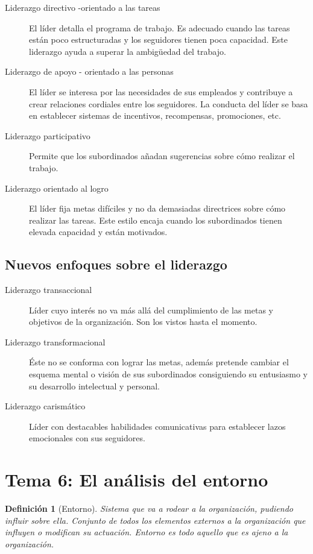 \documentclass[12pt]{article}
\theoremstyle{definition_wo_parentheses}
\newtheorem{definicion}{Definición}[section]
\begin{document}
\begin{description}
\item[Liderazgo directivo -orientado a las tareas] El líder detalla el programa de trabajo. Es adecuado cuando las tareas están poco estructuradas y los seguidores tienen poca capacidad. Este liderazgo ayuda a superar la ambigüedad del trabajo.
\item[Liderazgo de apoyo - orientado a las personas] El líder se interesa por las necesidades de sus empleados y contribuye a crear relaciones cordiales entre los seguidores. La conducta del líder se basa en establecer sistemas de incentivos, recompensas, promociones, etc.
\item[Liderazgo participativo] Permite que los subordinados añadan sugerencias sobre cómo realizar el trabajo.
\item[Liderazgo orientado al logro] El líder fija metas difíciles y no da demasiadas directrices sobre cómo realizar las tareas. Este estilo encaja cuando los subordinados tienen elevada capacidad y están motivados.
\end{description}

\subsection{Nuevos enfoques sobre el liderazgo}

\begin{description}
\item[Liderazgo transaccional] Líder cuyo interés no va más allá del cumplimiento de las metas y objetivos de la organización. Son los vistos hasta el momento. 
\item[Liderazgo transformacional] Éste no se conforma con lograr las metas, además pretende cambiar el esquema mental o visión de sus subordinados consiguiendo su entusiasmo y su desarrollo intelectual y personal.
\item[Liderazgo carismático] Líder con destacables habilidades comunicativas para establecer lazos emocionales con sus seguidores.
\end{description}

\section{Tema 6: El análisis del entorno}

\begin{definicion}[Entorno]
	Sistema que va a rodear a la organización, pudiendo influir sobre ella. Conjunto de todos los elementos externos a la organización que influyen o modifican su actuación. Entorno es todo aquello que es ajeno a la organización.
\end{definicion}
\end{document}
